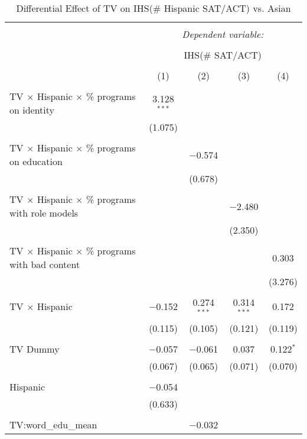 
\begin{table}[!htbp] \centering 
  \caption{Differential Effect of TV on IHS(\# Hispanic SAT/ACT) vs. Asian} 
  \label{} 
\begin{tabular}{@{\extracolsep{-2pt}}lcccc} 
\\[-1.8ex]\hline 
\hline \\[-1.8ex] 
 & \multicolumn{4}{c}{\textit{Dependent variable:}} \\ 
\cline{2-5} 
\\[-1.8ex] & \multicolumn{4}{c}{IHS(\# SAT/ACT)} \\ 
\\[-1.8ex] & (1) & (2) & (3) & (4)\\ 
\hline \\[-1.8ex] 
 TV $\times$ Hispanic $\times$ \% programs on identity & 3.128$^{***}$ &  &  &  \\ 
  & (1.075) &  &  &  \\ 
  & & & & \\ 
 TV $\times$ Hispanic $\times$ \% programs on education &  & $-$0.574 &  &  \\ 
  &  & (0.678) &  &  \\ 
  & & & & \\ 
 TV $\times$ Hispanic $\times$ \% programs with role models &  &  & $-$2.480 &  \\ 
  &  &  & (2.350) &  \\ 
  & & & & \\ 
 TV $\times$ Hispanic $\times$ \% programs with bad content &  &  &  & 0.303 \\ 
  &  &  &  & (3.276) \\ 
  & & & & \\ 
 TV $\times$ Hispanic & $-$0.152 & 0.274$^{***}$ & 0.314$^{***}$ & 0.172 \\ 
  & (0.115) & (0.105) & (0.121) & (0.119) \\ 
  & & & & \\ 
 TV Dummy & $-$0.057 & $-$0.061 & 0.037 & 0.122$^{*}$ \\ 
  & (0.067) & (0.065) & (0.071) & (0.070) \\ 
  & & & & \\ 
 Hispanic & $-$0.054 &  &  &  \\ 
  & (0.633) &  &  &  \\ 
  & & & & \\ 
 TV:word\_edu\_mean &  & $-$0.032 &  &  \\ 

\end{tabular}
\end{table}
